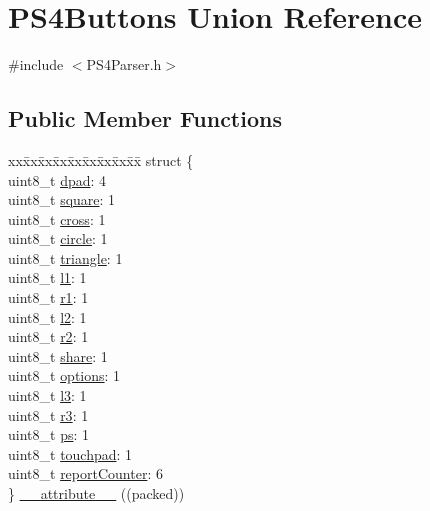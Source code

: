 \hypertarget{union_p_s4_buttons}{\section{\-P\-S4\-Buttons \-Union \-Reference}
\label{union_p_s4_buttons}
}


{\ttfamily \#include $<$\-P\-S4\-Parser.\-h$>$}

\subsection*{\-Public \-Member \-Functions}
\begin{DoxyCompactItemize}
\item 
\begin{tabbing}
xx\=xx\=xx\=xx\=xx\=xx\=xx\=xx\=xx\=\kill
struct \{\\
\>uint8\_t \hyperlink{union_p_s4_buttons_a99e2971b4e511a8d1bb718408f559a92}{dpad}: 4\\
\>uint8\_t \hyperlink{union_p_s4_buttons_a84eb7076098ec3135bdc440a279fde50}{square}: 1\\
\>uint8\_t \hyperlink{union_p_s4_buttons_a1163dc3517b1c27093b7cdd597eaa9fd}{cross}: 1\\
\>uint8\_t \hyperlink{union_p_s4_buttons_a95340b24c0846c778d2d8d0c983f4cdb}{circle}: 1\\
\>uint8\_t \hyperlink{union_p_s4_buttons_a72d07e9a47b1b75474e152b6aaeae6e5}{triangle}: 1\\
\>uint8\_t \hyperlink{union_p_s4_buttons_a3488f850c1de8d49a9dc932f1575e5e4}{l1}: 1\\
\>uint8\_t \hyperlink{union_p_s4_buttons_aba0cb76ee82bd0ebe9872aa7bcbffac6}{r1}: 1\\
\>uint8\_t \hyperlink{union_p_s4_buttons_a99b88dcb511243ea0c046cac1f5633ec}{l2}: 1\\
\>uint8\_t \hyperlink{union_p_s4_buttons_a416642ff357b1313825fe94e0491b60e}{r2}: 1\\
\>uint8\_t \hyperlink{union_p_s4_buttons_adf2ff3e6e4050070a68e90a83be81e92}{share}: 1\\
\>uint8\_t \hyperlink{union_p_s4_buttons_a27f1b87f473ace3a4465ae999858357b}{options}: 1\\
\>uint8\_t \hyperlink{union_p_s4_buttons_ab8835f04d0c0c5e630d685ec2fd54e80}{l3}: 1\\
\>uint8\_t \hyperlink{union_p_s4_buttons_a09805f3bcc362c410d7897792599d61d}{r3}: 1\\
\>uint8\_t \hyperlink{union_p_s4_buttons_a5fdf37790214db1379457bab99adace9}{ps}: 1\\
\>uint8\_t \hyperlink{union_p_s4_buttons_a785305478e29a078003c360babb50ab0}{touchpad}: 1\\
\>uint8\_t \hyperlink{union_p_s4_buttons_a5c27c151ad76a3675dce1eda1a3e4cc4}{reportCounter}: 6\\
\} \hyperlink{union_p_s4_buttons_a8514cf54b95c8716ab2833f3e40f92fe}{\_\_attribute\_\_} ((packed))\\

\end{tabbing}\end{DoxyCompactItemize}
